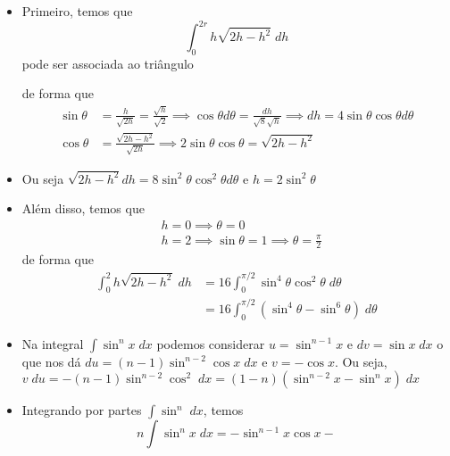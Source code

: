 \documentclass[brazilian,11pt]{article}
\begin{document}
\begin{itemize}
    \item Primeiro, temos que
        \[
            \int_0^{2r} h\sqrt{2h-h^2}\; dh
        \]
        pode ser associada ao triângulo 
        \begin{center}
        \end{center}
        de forma que
        \begin{align*}
            \sin \theta &= \frac{h}{\sqrt{2h}}=\frac{\sqrt{h}}{\sqrt{2}}
            \implies \cos{\theta}d\theta = \frac{dh}{\sqrt{8}\sqrt{h}} 
            \implies dh=4\sin\theta\cos\theta d\theta\\
            \cos\theta &= \frac{\sqrt{2h-h^2}}{\sqrt{2h}}
            \implies 2\sin\theta\cos\theta=\sqrt{2h-h^2}
        \end{align*}
    \item Ou seja \(\sqrt{2h-h^2}dh=8\sin^2\theta\cos^2\theta d\theta\)
        e \(h=2\sin^2\theta\)
    \item Além disso, temos que
        \begin{align*}
            & h=0 \implies \theta=0 \\
            & h=2 \implies \sin\theta = 1 \implies \theta = \frac{\pi}{2}
        \end{align*}
        de forma que
        \[
            \begin{split}
                \int_0^{2} h\sqrt{2h-h^2}\; dh &=
                16\int_0^{\pi/2}\sin^4\theta\cos^2\theta\;d\theta \\
                &= 16\int_0^{\pi/2}(\sin^4\theta-\sin^6\theta)\; d\theta
            \end{split}
        \]
    \item Na integral \(\int \sin^n x\; dx\) podemos considerar
        \(u=\sin^{n-1}x\) e \(dv=\sin x\; dx\) o que nos dá
        \(du=(n-1) \sin^{n-2}\cos x\; dx\) e 
        \(v=-\cos x\). Ou seja, 
        \(v\;du=-(n-1)\sin^{n-2}\cos^2\;dx=(1-n)(\sin^{n-2} x - \sin^n x)\; dx\)
    \item Integrando por partes \(\int \sin^n\;  dx\), temos
        \[
            n\int \sin^n x\; dx = -\sin^{n-1} x \cos x-
\]
\end{itemize}
\end{document}

